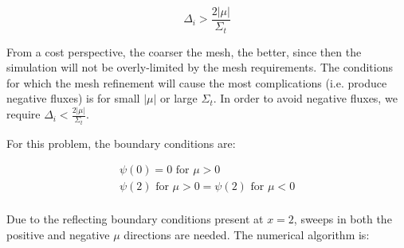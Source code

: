 \documentclass[10pt]{article}
\newcommand*\circled[1]{\tikz[baseline=(char.base)]{
            \node[shape=circle,draw,inner sep=2pt] (char) {#1};}}
\begin{document}
\begin{equation}
\label{eq:NegativeCondition}
\Delta_i>\frac{2|\mu|}{\Sigma_t}
\end{equation}

From a cost perspective, the coarser the mesh, the better, since then the simulation will not be overly-limited by the mesh requirements. The conditions for which the mesh refinement will cause the most complications (i.e. produce negative fluxes) is for small \(|\mu|\) or large \(\Sigma_t\). In order to avoid negative fluxes, we require \(\Delta_i<\frac{2|\mu|}{\Sigma_t}\).\newline 

\circled{3} For this problem, the boundary conditions are:

\begin{equation}
\begin{aligned}
\psi(0)=0 \text{ for } \mu>0\\
\psi(2) \text{ for } \mu>0 = \psi(2) \text{ for } \mu<0\\
\end{aligned}
\end{equation}

Due to the reflecting boundary conditions present at \(x=2\), sweeps in both the positive and negative \(\mu\) directions are needed. The numerical algorithm is:
\end{document}
